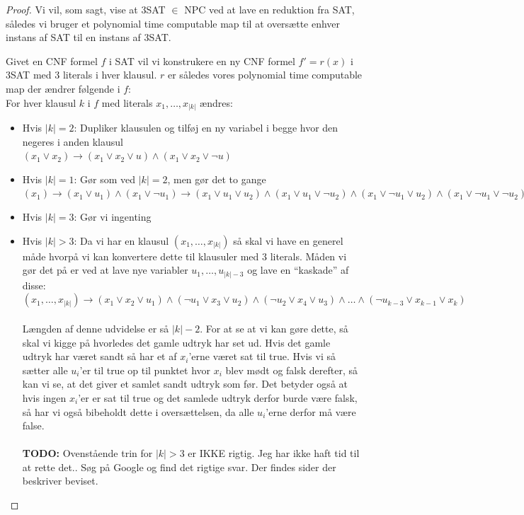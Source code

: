 \begin{proof}
 Vi vil, som sagt, vise at 3SAT $\in$ NPC ved at lave en reduktion fra SAT, således vi bruger et polynomial time computable map til at oversætte enhver instans af SAT til en instans af 3SAT. 

Givet en CNF formel $f$ i SAT vil vi konstrukere en ny CNF formel $f' = r(x)$ i 3SAT med 3 literals i hver klausul. $r$ er således vores polynomial time computable map der ændrer følgende i $f$:\\

For hver klausul $k$ i $f$ med literals $x_1, \hdots, x_{|k|}$ ændres:
\begin{itemize}
\item Hvis $|k| = 2$: Dupliker klausulen og tilføj en ny variabel i begge hvor den negeres i anden klausul \\
  $(x_1 \vee x_2) \rightarrow (x_1 \vee x_2 \vee u) \wedge (x_1 \vee
  x_2 \vee \neg u)$
\item Hvis $|k| = 1$: Gør som ved $|k| = 2$, men gør det to gange \\
  $(x_1) \rightarrow (x_1 \vee u_1) \wedge (x_1 \vee \neg u_1)
  \rightarrow (x_1 \vee u_1 \vee u_2) \wedge (x_1 \vee u_1 \vee \neg
  u_2) \wedge (x_1 \vee \neg u_1 \vee u_2) \wedge (x_1 \vee \neg u_1
  \vee \neg u_2)$
\item Hvis $|k| = 3$: Gør vi ingenting
\item Hvis $|k| > 3$: Da vi har en klausul $(x_1,\hdots,x_{|k|})$ så skal vi have en generel måde hvorpå vi kan konvertere dette til klausuler med 3 literals. Måden vi gør det på er ved at lave nye variabler $u_1,\hdots,u_{|k|-3}$ og lave en ``kaskade'' af disse:\\
  $(x_1,\hdots,x_{|k|}) \rightarrow (x_1 \vee x_2 \vee u_1) \wedge
  (\neg u_1 \vee x_3 \vee u_2) \wedge
  (\neg u_2 \vee x_4 \vee u_3 ) \wedge
  \hdots \wedge (\neg u_{k-3} \vee x_{k-1} \vee x_{k} ) $ \\
  ~\\
  Længden af denne udvidelse er så $|k|-2$.
  For at se at vi kan gøre dette, så skal vi kigge på hvorledes det gamle udtryk har set ud. Hvis det gamle udtryk har været sandt så har et af $x_i$'erne været sat til true. Hvis vi så sætter alle $u_i$'er til true op til punktet hvor $x_i$ blev mødt og falsk derefter, så kan vi se, at det giver et samlet sandt udtryk som før. Det betyder også at hvis ingen $x_i$'er er sat til true og det samlede udtryk derfor burde være falsk, så har vi også bibeholdt dette i oversættelsen, da alle $u_i$'erne derfor må være false.\\
  ~\\
  \textbf{TODO:} Ovenstående trin for $|k| > 3$ er IKKE rigtig. Jeg
  har ikke haft tid til at rette det.. Søg på Google og find det
  rigtige svar. Der findes sider der beskriver beviset.
\end{itemize}


\end{proof}
